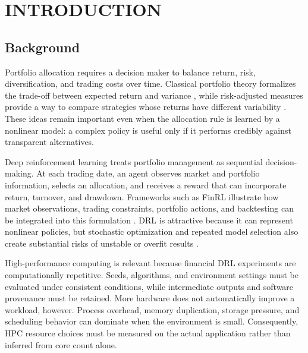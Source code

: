 \documentclass[12pt,a4paper,oneside]{book}
\begin{document}
\newpage
\tableofcontents

\newpage
{}
\listoffigures

\newpage
{}
\listoftables

\clearpage
{}

\chapter{INTRODUCTION}

\section{Background}

Portfolio allocation requires a decision maker to balance return, risk, diversification, and trading costs over time. Classical portfolio theory formalizes the trade-off between expected return and variance \cite{markowitz1952}, while risk-adjusted measures provide a way to compare strategies whose returns have different variability \cite{sharpe1994}. These ideas remain important even when the allocation rule is learned by a nonlinear model: a complex policy is useful only if it performs credibly against transparent alternatives.

Deep reinforcement learning treats portfolio management as sequential decision-making. At each trading date, an agent observes market and portfolio information, selects an allocation, and receives a reward that can incorporate return, turnover, and drawdown. Frameworks such as FinRL illustrate how market observations, trading constraints, portfolio actions, and backtesting can be integrated into this formulation \cite{liu2020finrl}. DRL is attractive because it can represent nonlinear policies, but stochastic optimization and repeated model selection also create substantial risks of unstable or overfit results \cite{bailey2017backtest,henderson2018drl}.

High-performance computing is relevant because financial DRL experiments are computationally repetitive. Seeds, algorithms, and environment settings must be evaluated under consistent conditions, while intermediate outputs and software provenance must be retained. More hardware does not automatically improve a workload, however. Process overhead, memory duplication, storage pressure, and scheduling behavior can dominate when the environment is small. Consequently, HPC resource choices must be measured on the actual application rather than inferred from core count alone.
\end{document}
